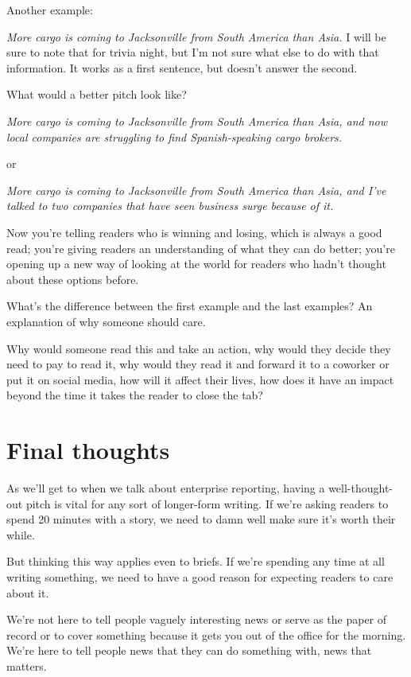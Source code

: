 \documentclass[
  12pt,
  american,
  letterpaperpaper,
  extrafontsizes,onecolumn,openright
  ]{memoir}
\begin{document}
Another example:

\emph{More cargo is coming to Jacksonville from South America than Asia.} I will be sure to note that for trivia night, but I'm not sure what else to do with that information. It works as a first sentence, but doesn't answer the second.

What would a better pitch look like?

\emph{More cargo is coming to Jacksonville from South America than Asia, and now local companies are struggling to find Spanish-speaking cargo brokers.}

or

\emph{More cargo is coming to Jacksonville from South America than Asia, and I've talked to two companies that have seen business surge because of it.}

Now you're telling readers who is winning and losing, which is always a good read; you're giving readers an understanding of what they can do better; you're opening up a new way of looking at the world for readers who hadn't thought about these options before.

What's the difference between the first example and the last examples? An explanation of why someone should care.

Why would someone read this and take an action, why would they decide they need to pay to read it, why would they read it and forward it to a coworker or put it on social media, how will it affect their lives, how does it have an impact beyond the time it takes the reader to close the tab?

\hypertarget{final-thoughts-1}{%
\section*{Final thoughts}\label{final-thoughts-1}}

As we'll get to when we talk about enterprise reporting, having a well-thought-out pitch is vital for any sort of longer-form writing. If we're asking readers to spend 20 minutes with a story, we need to damn well make sure it's worth their while.

But thinking this way applies even to briefs. If we're spending any time at all writing something, we need to have a good reason for expecting readers to care about it.

We're not here to tell people vaguely interesting news or serve as the paper of record or to cover something because it gets you out of the office for the morning. We're here to tell people news that they can do something with, news that matters.
\end{document}
